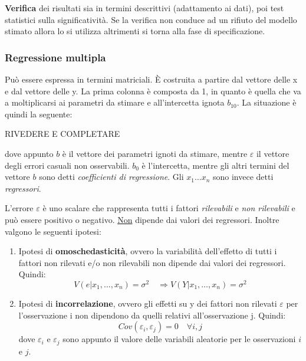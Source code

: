 \documentclass[]{article}
\begin{document}
\textbf{Verifica} dei risultati sia in termini descrittivi (adattamento
ai dati), poi test statistici sulla significatività. Se la verifica non
conduce ad un rifiuto del modello stimato allora lo si utilizza
altrimenti si torna alla fase di specificazione.

\subsubsection{Regressione multipla}\label{regressione-multipla}

Può essere espressa in termini matriciali. È costruita a partire dal
vettore delle x e dal vettore delle y. La prima colonna è composta da 1, in quanto è quella che va a moltiplicarsi ai parametri da stimare e all'intercetta ignota $b_{10}$. La situazione è quindi la seguente:

RIVEDERE E COMPLETARE

dove appunto $b$ è il vettore dei parametri ignoti da stimare, mentre $\varepsilon$ il vettore degli errori casuali non osservabili. $b_0$ è l'intercetta, mentre gli altri termini del vettore $b$ sono  detti \textit{coefficienti di regressione}.  Gli $x_1 \dots x_n$ sono invece detti \textit{regressori}.

L'errore $\varepsilon$ è uno scalare che rappresenta tutti i fattori \textit{rilevabili} e \textit{non rilevabili} e può essere positivo o negativo. \underline{Non} dipende dai valori dei regressori. Inoltre valgono le seguenti ipotesi:
\begin{enumerate}
\item Ipotesi di \textbf{omoschedasticità}, ovvero la  variabilità  dell'effetto  di  tutti  i  fattori  non  rilevati  e/o  non  rilevabili  non  dipende  dai 
valori dei regressori. Quindi:
\begin{equation}
V(e \vert x_1, \dots, x_n) = \sigma^2 \quad \Rightarrow V(Y \vert x_1, \dots, x_n) = \sigma^2
\end{equation}
\item Ipotesi di \textbf{incorrelazione}, ovvero gli  effetti su y dei  fattori  non  rilevati $\varepsilon$  per  l'osservazione i non  dipendono  da  quelli relativi all'osservazione j. Quindi:
\begin{equation}
Cov(\varepsilon_i, \varepsilon_j) = 0 \quad \forall i, j
\end{equation}
dove $\varepsilon_i$ e $\varepsilon_j$ sono appunto il valore delle variabili aleatorie per le osservazioni $i$ e $j$.
\end{enumerate}
\end{document}
